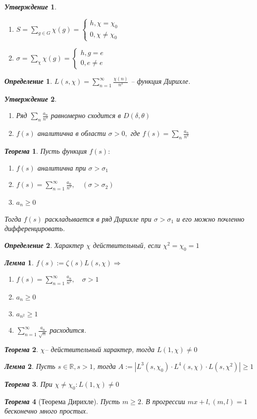 \documentclass[a4paper,12pt]{article}
\newtheorem{deff2}{\textit{Определение}}
\newtheorem{teo2}{\textit{Теорема}}
\newtheorem{utv2}{\textit{Утверждение}}
\newtheorem{lem2}{\textit{Лемма}}
\newcommand{\TE}{\theta}
\newcommand{\q}{\quad}
\newcommand{\Ra}{\Rightarrow}
\newcommand{\bb}[1]{\mathbb{#1}}
\newcommand{\SL}{\sum\limits}
\begin{document}
\begin{utv2}
\begin{enumerate}
\item $S = \SL_{g\in G}\chi(g) = \begin{cases}h, \chi = \chi_0\\ 0, \chi \not= \chi_0\end{cases}$
\item $\sigma = \SL_{\chi}\chi(g) = \begin{cases}h, g = e\\ 0, e \not= e\end{cases}$
\end{enumerate}
\end{utv2}

\begin{deff2}
$L(s,\chi) = \SL_{n=1}^\infty \frac{\chi(n)}{n^s}$ -- функция Дирихле.
\end{deff2}

\begin{utv2}\q\\
\begin{enumerate}
\item Ряд $\SL_n \frac{a_n}{n^s} $ равномерно сходится в $D(\delta, \TE)$
\item $f(s)$ аналитична в области $\sigma > 0,$ где $f(s) = \SL_n\frac{a_n}{n^s}$
\end{enumerate}
\end{utv2}
\begin{teo2} Пусть функция $f(s):$
\begin{enumerate}
\item $f(s)$ аналитична при $\sigma > \sigma_1$
\item $f(s) = \SL_{n=1}^\infty  \frac{a_n}{n^s},\q(\sigma > \sigma_2) $
\item $a_n \ge 0$
\end{enumerate}
Тогда $f(s)$ раскладывается в ряд Дирихле при $\sigma > \sigma_1$ и его можно почленно дифференцировать.
\end{teo2}
\begin{deff2} Характер $\chi$ действительный, если $\chi^2 = \chi_0 = 1$
\end{deff2}
\begin{lem2} $f(s):= \zeta(s) L(s,\chi) \Ra$
\begin{enumerate}
\item $f(s) = \SL_{n=1}^\infty \frac{a_n}{n^s},\q\sigma > 1 $
\item $a_n \ge 0$
\item $a_{n^2} \ge 1$
\item $\SL_{n=1}^\infty \frac{a_n}{\sqrt{n}} $ расходится.
\end{enumerate}
\end{lem2}
\begin{teo2} $\chi$-- действительный характер, тогда $L(1, \chi) \not=0$
\end{teo2}
\begin{lem2} Пусть $s\in \bb{R}, s > 1$, тогда $A:= |L^3(s,\chi_0)\cdot L^4(s,\chi)\cdot L(s, \chi^2)| \ge 1$
\end{lem2}

\begin{teo2} При $\chi \not= \chi_0: L(1,\chi)\not=0$
\end{teo2}


\begin{teo2}[Теорема Дирихле] Пусть $m\ge 2$. В прогрессии $mx+l, (m,l) = 1$ бесконечно много простых.
\end{teo2}
\end{document}
